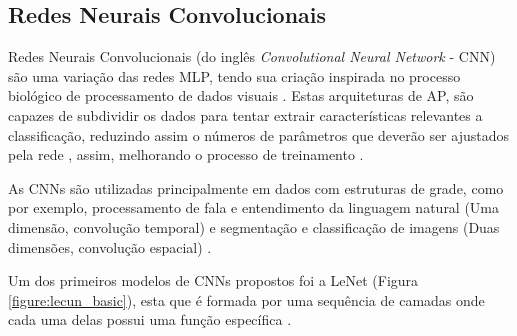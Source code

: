 


\subsection{Redes Neurais Convolucionais}

Redes Neurais Convolucionais (do inglês \textit{Convolutional Neural Network} - CNN) são uma variação das redes MLP, tendo sua criação inspirada no processo biológico de processamento de dados visuais \cite{Caroline2016}. Estas arquiteturas de AP, são capazes de subdividir os dados para tentar extrair características relevantes a classificação, reduzindo assim o números de parâmetros que deverão ser ajustados pela rede \cite{Miyazaki2017}, assim, melhorando o processo de treinamento \cite{Miyazaki2017}. %

As CNNs são utilizadas principalmente em dados com estruturas de grade, como por exemplo, processamento de fala e entendimento da linguagem natural (Uma dimensão, convolução temporal) \cite{Miyazaki2017} e segmentação e classificação de imagens (Duas dimensões, convolução espacial) \cite{Miyazaki2017, Goodfellow-et-al-2016}.

Um dos primeiros modelos de CNNs propostos foi a LeNet \cite{LeCun1998} (Figura \ref{figure:lecun_basic}), esta que é formada por uma sequência de camadas onde cada uma delas possui uma função específica \cite{Carneiro2017}. 


